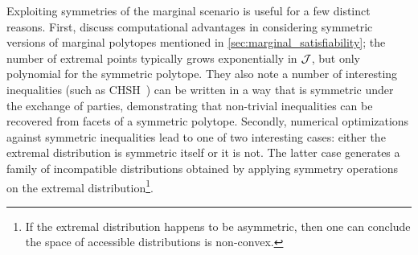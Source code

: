 \documentclass[aps, 10pt, english, twoside, pra, nofootinbib, tightenlines, longbibliography, superscriptaddress]{revtex4-1}
\begin{document}
    Exploiting symmetries of the marginal scenario is useful for a few distinct reasons. First, \citet{Bancal_2010} discuss computational advantages in considering symmetric versions of marginal polytopes mentioned in \cref{sec:marginal_satisfiability}; the number of extremal points typically grows exponentially in $\mathcal{J}$, but only polynomial for the symmetric polytope. They also note a number of interesting inequalities (such as CHSH~\cite{CHSH_Original}) can be written in a way that is symmetric under the exchange of parties, demonstrating that non-trivial inequalities can be recovered from facets of a symmetric polytope. Secondly, numerical optimizations against symmetric inequalities lead to one of two interesting cases: either the extremal distribution is symmetric itself or it is not. The latter case generates a family of incompatible distributions obtained by applying symmetry operations on the extremal distribution\footnote{If the extremal distribution happens to be asymmetric, then one can conclude the space of accessible distributions is non-convex.}.
\end{document}
